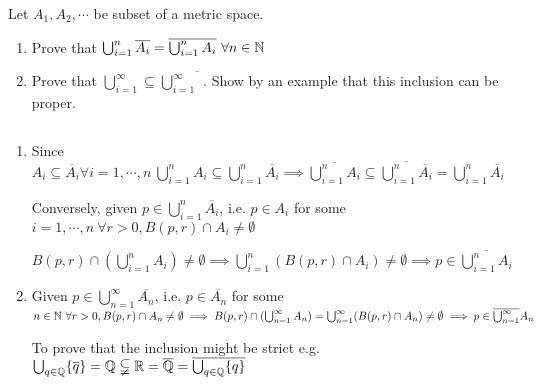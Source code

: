 Let $A_1,A_2,\cdots$ be subset of a metric space.

\begin{enumerate}
	\item Prove that $\bigcup^n_{i = 1}\overline{A_i} = \overline{\bigcup^n_{i=1}A_i} ~ \forall n \in \mathbb{N}$
	\item Prove that $\bigcup^{\infty}_{i = 1} \subseteq \overline{\bigcup^{\infty}_{i=1}}$. Show by an example that this inclusion can be proper.
\end{enumerate}


\begin{solution} $ $

	\begin{enumerate}
		\item Since $A_i \subseteq \overline{A_i} \forall i = 1,\cdots,n ~ \bigcup^n_{i=1}A_i \subseteq \bigcup^n_{i=1}\overline{A_i} \implies \overline{\bigcup_{i=1}^nA_i} \subseteq \overline{\bigcup_{i=1}^{n}\overline{A_i}} = \bigcup^n_{i=1}\overline{A_i}$
		
		Conversely, given $p \in \bigcup_{i=1}^n\overline{A_i}$, i.e. $p \in A_i$ for some $i = 1,\cdots,n~\forall r > 0, B(p,r) \cap A_i \neq \emptyset$
		
		$B(p,r) \cap (\bigcup^n_{i=1}A_i) \neq \emptyset \implies \bigcup^n_{i=1}(B(p,r) \cap A_i) \neq \emptyset \implies p \in \overline{\bigcup^n_{i=1} A_i}$
		\item Given $p \in \bigcup_{n=1}^{\infty}\overline{A_n}$, i.e. $p \in \overline{A_n}$ for some $n \in \mathbb{N} ~ \forall r > 0, B(p,r) \cap A_n \neq \emptyset \implies B(p,r) \cap (\bigcup^{\infty}_{n = 1}A_n) = \bigcup^{\infty}_{n = 1}(B(p,r) \cap A_n) \neq \emptyset \implies p \in \overline{\bigcup^{\infty}_{n = 1}}A_n$
		
		To prove that the inclusion might be strict e.g. $\bigcup_{q \in \mathbb{Q}}\{\overline{q}\} = \mathbb{Q} \subsetneqq \mathbb{R} = \overline{\mathbb{Q}} = \overline{\bigcup_{q \in \mathbb{Q}}\{q\}}$
	\end{enumerate}		
\end{solution}
